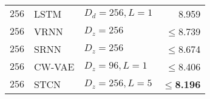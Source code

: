 {\begin{table}
\begin{tabular}{ll|lr}
        $256$      & LSTM                & $D_d=256, L=1$        & 8.959 \\  %
        $256$      & VRNN                & $D_z=256$             & $\leq$8.739 \\
        $256$      & SRNN                & $D_z=256$             & $\leq$8.674 \\
        $256$      & CW-VAE              & $D_z=96, L=1$         & $\leq$8.406 \\
        $256$      & STCN                & $D_z=256,L=5$  & $\leq$\textbf{8.196} \\
        \bottomrule
    \end{tabular}
    \vspace{2mm}
    \label{tab: timit likelihoods dmol linear appendix}
\end{table}


}
